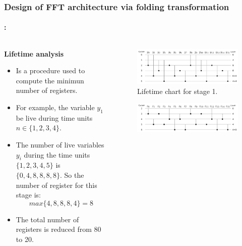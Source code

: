\begin{frame}
	\frametitle{\textbf{Design of FFT architecture via folding transformation}}
	\framesubtitle{\secname : \subsecname}
	\vspace{-0.5cm}
	 \begin{columns}[t,onlytextwidth]
	      \begin{column}{0.5\linewidth}
			\begin{block}{\centering \textbf{Lifetime analysis}}
				\begin{itemize}\justifying\footnotesize
					\item Is a procedure used to compute the minimun number of registers. \vfill
					\item For example, the variable $y_1$ be live during time units $n \in \{1,2,3,4\}$.
					\item The number of live variables $y_i$ during the time units $\{1,2,3,4,5\}$ is $\{0,4,8,8,8,8\}$. So the number of register for this stage is: \vfill
					\begin{equation*}
						max\{4,8,8,8,4\} = 8
					\end{equation*}
					\item The total number of registers is reduced from 80 to 20. \vfill
		       	\end{itemize}
			\end{block}
   		  \end{column}
   		  \begin{column}{0.5\linewidth}
   		  	 \vspace{-0.5cm}
   			\begin{figure}[h!] \centering
	    		\includegraphics[width=0.40\paperwidth]{./image/life_chart_a.png}
	    		\caption{\footnotesize Lifetime chart for stage 1.}
	    	\end{figure}
	    	\vspace{-1cm}
	    	\begin{figure}[h!] \centering
	    		\includegraphics[width=0.40\paperwidth]{./image/life_chart_b.png}

\end{figure}
\end{column}
\end{columns}
\end{frame}

